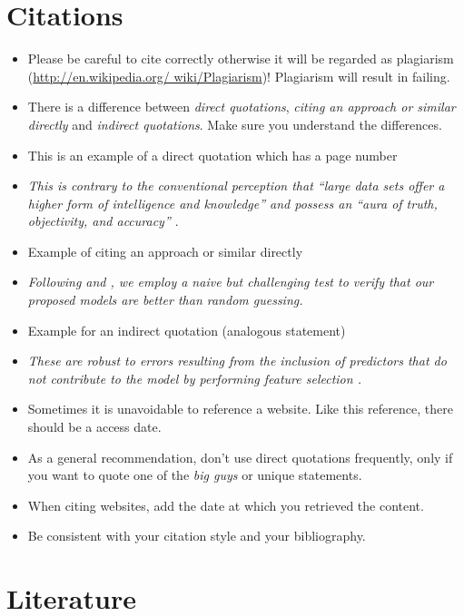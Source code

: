 \documentclass{thesisclass}
\begin{document}
\section{Citations}
\begin{itemize}
\item Please be careful to cite correctly otherwise it will be regarded as plagiarism (\url{http://en.wikipedia.org/ wiki/Plagiarism})! Plagiarism will result in failing.
\item There is a difference between \emph{direct quotations}, \emph{citing an approach or similar directly} and \emph{indirect quotations}. Make sure you understand the differences.
\item This is an example of a direct quotation which has a page number
\item[] \emph{This is contrary to the conventional perception that ``large data sets offer a higher form of intelligence and knowledge'' and possess an ``aura of truth, objectivity, and accuracy'' \citep[663]{boyd2012critical}}.
\item Example of citing an approach or similar directly 
\item[] \emph{Following \citet{conejo2005day} and \citet{misiorek2006point}, we employ a naive but challenging test to verify that our proposed models are better than random guessing.}

\item Example for an indirect quotation (analogous statement) 
\item[] \emph{These are robust to errors resulting from the inclusion of predictors that do not contribute to the model by performing feature selection \citep{kuhn2013applied}.}

\item Sometimes it is unavoidable to reference a website. Like this \citet{Model3Tesla2019} reference, there should be a access date.
\item As a general recommendation, don't use direct quotations frequently, only if you want to quote one of the \emph{big guys} or unique statements.
\item When citing websites, add the date at which you retrieved the content.
\item Be consistent with your citation style and your bibliography.
\end{itemize}

\section{Literature}
\end{document}

